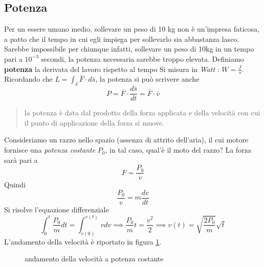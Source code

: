 \documentclass[10pt, letterpaper]{report}
\begin{document}
\subsection{Potenza}
Per un essere umano medio, sollevare un peso di 10 kg non è un'impresa faticosa, a patto che il tempo in cui egli
impiega per sollevarlo sia abbastanza lasco. Sarebbe impossibile per chiunque infatti, sollevare un peso di 10kg in 
un tempo pari a $10^{-3}$ secondi, la potenza necessaria sarebbe troppo elevata.\acc 
{}  Definiamo \textbf{potenza} la derivata del lavoro rispetto al tempo 
Si misura in \textit{Watt} : $W=\frac{J}{s}$.
Ricordando che $L=\int_\delta \bar F\cdot d\bar s$, la potenza si può scrivere anche 
$$ P=\bar F\cdot \frac{d\bar s}{dt}=\bar F\cdot \bar v$$
\begin{quote}
    la potenza è data dal prodotto della forza applicata e della velocità con cui il punto di applicazione della forza si muove.
\end{quote}
Consideriamo un razzo nello spazio (assenza di attrito dell'aria), il cui motore fornisce una 
\textit{potenza costante} $P_0$, in tal caso, qual'è il moto del razzo? La forza sarà pari a 
$$ F=\frac{P_0}{v}$$
Quindi 
$$ \frac{P_0}{v}=m\frac{dv}{dt}$$
Si risolve l'equazione differenziale 
$$ \int_0^t\frac{P_0}{m}dt=\int_{v(0)}^{v(t)}vdv\implies \frac{P_0}{m}t=\frac{v^2}{2}\implies v(t) = \sqrt{\frac{2P_0}{m}}\sqrt{t}$$
L'andamento della velocità è riportato in figura \ref{potCostante}.
\begin{figure}[h!]\centering
    \caption{andamento della velocità a potenza costante}
        \label{potCostante}
\end{figure}
\end{document}
